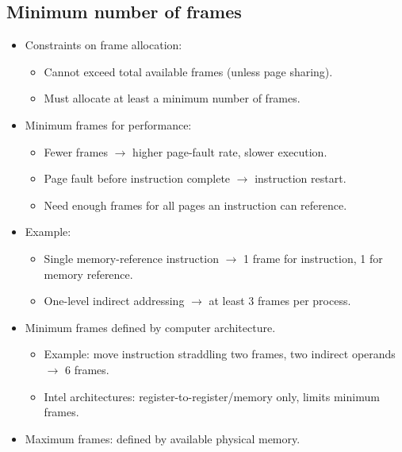 \subsection{Minimum number of frames}
\begin{itemize}
    \item Constraints on frame allocation:
    \begin{itemize}
        \item Cannot exceed total available frames (unless page sharing).
        \item Must allocate at least a minimum number of frames.
    \end{itemize}
    \item Minimum frames for performance:
    \begin{itemize}
        \item Fewer frames $\rightarrow$ higher page-fault rate, slower execution.
        \item Page fault before instruction complete $\rightarrow$ instruction restart.
        \item Need enough frames for all pages an instruction can reference.
    \end{itemize}
    \item Example:
    \begin{itemize}
        \item Single memory-reference instruction $\rightarrow$ 1 frame for instruction, 1 for memory reference.
        \item One-level indirect addressing $\rightarrow$ at least 3 frames per process.
    \end{itemize}
    \item Minimum frames defined by computer architecture.
    \begin{itemize}
        \item Example: move instruction straddling two frames, two indirect operands $\rightarrow$ 6 frames.
        \item Intel architectures: register-to-register/memory only, limits minimum frames.
    \end{itemize}
    \item Maximum frames: defined by available physical memory.
\end{itemize}

